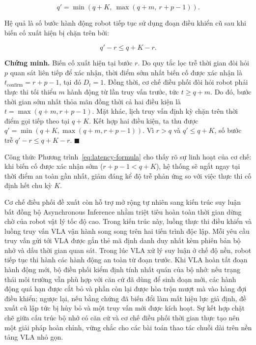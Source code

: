 \begin{equation}
q' = \min(q + K,\ \max(q + m,\ r + p - 1)).
\label{eq:latency-formula}
\end{equation}

Hệ quả là số bước hành động robot tiếp tục sử dụng đoạn điều khiển cũ sau khi biến cố xuất hiện bị chặn trên bởi:

\begin{equation}
q' - r \le q + K - r.
\label{eq:latency-bound}
\end{equation}

\textbf{Chứng minh.} Biến cố xuất hiện tại bước $r$. Do quy tắc lọc trễ thời gian đòi hỏi $p$ quan sát liên tiếp để xác nhận, thời điểm sớm nhất biến cố được xác nhận là $t_{\mathrm{confirm}} = r + p - 1$, tại đó $D_t = 1$. Đồng thời, cơ chế điều phối đòi hỏi robot phải thực thi tối thiểu $m$ hành động từ lần truy vấn trước, tức $t \ge q + m$. Do đó, bước thời gian sớm nhất thỏa mãn đồng thời cả hai điều kiện là $t = \max(q + m, r + p - 1)$. Mặt khác, lịch truy vấn định kỳ chặn trên thời điểm gọi tiếp theo tại $q + K$. Kết hợp hai điều kiện, ta thu được $q' = \min(q + K, \max(q + m, r + p - 1))$. Vì $r > q$ và $q' \le q + K$, số bước trễ $q' - r \le q + K - r$. $\blacksquare$

Công thức Phương trình~\eqref{eq:latency-formula} cho thấy rõ sự linh hoạt của cơ chế: khi biến cố được xác nhận sớm ($r + p - 1 < q + K$), hệ thống sẽ ngắt ngay tại thời điểm an toàn gần nhất, giảm đáng kể độ trễ phản ứng so với việc thực thi cố định hết chu kỳ $K$.

Cơ chế điều phối đề xuất còn hỗ trợ mở rộng tự nhiên sang kiến trúc suy luận bất đồng bộ Asynchronous Inference nhằm triệt tiêu hoàn toàn thời gian dừng chờ của robot vật lý tốc độ cao. Trong kiến trúc này, luồng thực thi điều khiển và luồng truy vấn VLA vận hành song song trên hai tiến trình độc lập. Mỗi yêu cầu truy vấn gửi tới VLA được gắn thẻ mã định danh duy nhất kèm phiên bản bộ nhớ và dấu thời gian quan sát. Trong lúc VLA xử lý suy luận ở chế độ nền, robot tiếp tục thi hành các hành động an toàn từ đoạn trước. Khi VLA hoàn tất đoạn hành động mới, bộ điều phối kiểm định tính nhất quán của bộ nhớ: nếu trạng thái môi trường vẫn phù hợp với căn cứ đã dùng để sinh đoạn mới, các hành động quá hạn được cắt bỏ và phần còn lại được hòa trộn mượt mà vào hàng đợi điều khiển; ngược lại, nếu bằng chứng đã biến đổi làm mất hiệu lực giả định, đề xuất cũ lập tức bị hủy bỏ và một truy vấn mới được kích hoạt. Sự kết hợp chặt chẽ giữa cấu trúc bộ nhớ có căn cứ và cơ chế điều phối thời gian thực tạo nên một giải pháp hoàn chỉnh, vững chắc cho các bài toán thao tác chuỗi dài trên nền tảng VLA nhỏ gọn.
